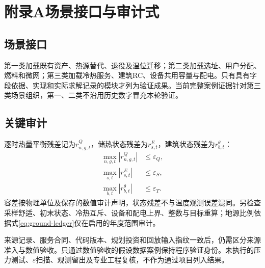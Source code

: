 \clearpage
\section*{附录A\quad 场景接口与审计式}

\subsection*{场景接口}
第一类加载既有资产、热源替代、退役及温位迁移；第二类加载选址、用户分配、燃料和微网；第三类加载冷热服务、建筑RC、设备共用容量与配电。只有具有字段依据、实现和实际求解记录的模块才列为验证成果。当前完整案例证据针对第三类场景组织，第一、二类不沿用历史数字冒充本轮验证。

\subsection*{关键审计}
逐时热量平衡残差记为$r_{n,g,t}^{Q}$，储热状态残差为$r_{s,t}^{E}$，建筑状态残差为$r_{b,t}^{\theta}$：
\begin{align}
\max_{n,g,t}|r_{n,g,t}^{Q}|&\leq\varepsilon_Q,\\
\max_{s,t}|r_{s,t}^{E}|&\leq\varepsilon_S,\\
\max_{b,t}|r_{b,t}^{\theta}|&\leq\varepsilon_T.
\end{align}
容差按物理单位及保存的数值审计声明，状态残差不与温度观测误差混同。另检查采样舒适、初末状态、冷热互斥、设备和配电上界、整数与目标重算；地源比例依据式\eqref{eq:ground-ledger}仅在启用的年度范围审计。

来源记录、服务合同、代码版本、规划投资和回放输入指纹一致后，仍需区分来源准入与数值验收。只通过数值验收的假设数据案例保持程序验证身份。未执行的压力测试、$\varepsilon$扫描、观测留出及专业工程复核，不作为通过项目列入结果。
